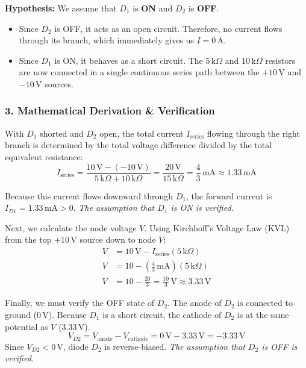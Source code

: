 \documentclass[12pt,a3paper]{article}
\begin{document}
\begin{enumerate}
\begin{tcolorbox}[enhanced,breakable,ansbox,colback=cA!4,colframe=cA,boxrule=0.8pt,arc=5pt,title={\textbf{Answer}},fonttitle=\bfseries\color{white},colbacktitle=cA]
\textbf{Hypothesis:} We assume that $D_1$ is \textbf{ON} and $D_2$ is \textbf{OFF}.
\begin{itemize}
    \item Since $D_2$ is OFF, it acts as an open circuit. Therefore, no current flows through its branch, which immediately gives us $I = 0\,\text{A}$.
    \item Since $D_1$ is ON, it behaves as a short circuit. The $5\,\text{k}\Omega$ and $10\,\text{k}\Omega$ resistors are now connected in a single continuous series path between the $+10\,\text{V}$ and $-10\,\text{V}$ sources.
\end{itemize}

\subsubsection*{3. Mathematical Derivation \& Verification}
With $D_1$ shorted and $D_2$ open, the total current $I_{\text{series}}$ flowing through the right branch is determined by the total voltage difference divided by the total equivalent resistance:
\begin{equation}
    I_{\text{series}} = \frac{10\,\text{V} - (-10\,\text{V})}{5\,\text{k}\Omega + 10\,\text{k}\Omega} = \frac{20\,\text{V}}{15\,\text{k}\Omega} = \frac{4}{3}\,\text{mA} \approx 1.33\,\text{mA}
\end{equation}

Because this current flows downward through $D_1$, the forward current is $I_{D1} = 1.33\,\text{mA} > 0$. \textit{The assumption that $D_1$ is ON is verified.}

Next, we calculate the node voltage $V$. Using Kirchhoff's Voltage Law (KVL) from the top $+10\,\text{V}$ source down to node $V$:
\begin{align}
    V &= 10\,\text{V} - I_{\text{series}}(5\,\text{k}\Omega) \nonumber \\
    V &= 10 - \left(\frac{4}{3}\,\text{mA}\right)(5\,\text{k}\Omega) \nonumber \\
    V &= 10 - \frac{20}{3} = \frac{10}{3}\,\text{V} \approx 3.33\,\text{V}
\end{align}

Finally, we must verify the OFF state of $D_2$. The anode of $D_2$ is connected to ground ($0\,\text{V}$). Because $D_1$ is a short circuit, the cathode of $D_2$ is at the same potential as $V$ ($3.33\,\text{V}$).
\begin{equation}
    V_{D2} = V_{\text{anode}} - V_{\text{cathode}} = 0\,\text{V} - 3.33\,\text{V} = -3.33\,\text{V}
\end{equation}
Since $V_{D2} < 0\,\text{V}$, diode $D_2$ is reverse-biased. \textit{The assumption that $D_2$ is OFF is verified.}


\end{tcolorbox}
\end{enumerate}
\end{document}
